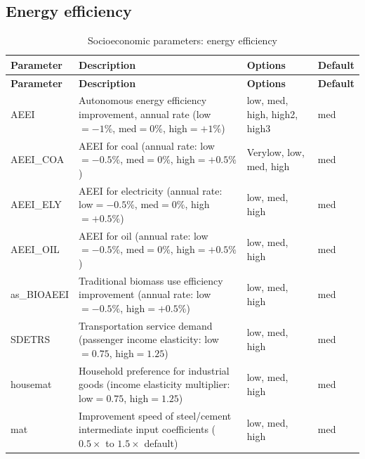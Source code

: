 \documentclass[10pt,a4paper,titlepage,dvipdfmx]{book}
\begin{document}
\subsection{Energy efficiency}
\begin{longtable}{|p{}|p{}|p{}|p{}|}
\caption{Socioeconomic parameters: energy efficiency}\label{tab:sp-soc-eneff}\\
\hline
\textbf{Parameter} & \textbf{Description} & \textbf{Options} & \textbf{Default} \\ \hline
\endfirsthead
\hline
\textbf{Parameter} & \textbf{Description} & \textbf{Options} & \textbf{Default} \\ \hline
\endhead
\hline
\endfoot
AEEI & Autonomous energy efficiency improvement, annual rate (low$=-1\%$, med$=0\%$, high$=+1\%$) & low, med, high, high2, high3 & med \\ \hline
AEEI\_COA & AEEI for coal (annual rate: low$=-0.5\%$, med$=0\%$, high$=+0.5\%$) & Verylow, low, med, high & med \\ \hline
AEEI\_ELY & AEEI for electricity (annual rate: low$=-0.5\%$, med$=0\%$, high$=+0.5\%$) & low, med, high & med \\ \hline
AEEI\_OIL & AEEI for oil (annual rate: low$=-0.5\%$, med$=0\%$, high$=+0.5\%$) & low, med, high & med \\ \hline
as\_BIOAEEI & Traditional biomass use efficiency improvement (annual rate: low$=-0.5\%$, high$=+0.5\%$) & low, med, high & med \\ \hline
SDETRS & Transportation service demand (passenger income elasticity: low$=0.75$, high$=1.25$) & low, med, high & med \\ \hline
housemat & Household preference for industrial goods (income elasticity multiplier: low$=0.75$, high$=1.25$) & low, med, high & med \\ \hline
mat & Improvement speed of steel/cement intermediate input coefficients ($0.5\times$ to $1.5\times$ default) & low, med, high & med \\ \hline
\end{longtable}
\end{document}
